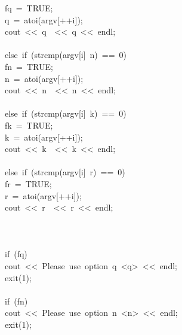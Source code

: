 \begin{tabbing}
\>\>\>fq\ =\ TRUE;\\[0pt]
\>\>\>q\ =\ atoi(argv[++i]);\\[0pt]
\>\>\>cout\ <<\ q\ \ <<\ q\ <<\ endl;\\[0pt]
\>\>\>\\[0pt]
\>\>else\ if\ (strcmp(argv[i]\ n)\ ==\ 0)\ \\[0pt]
\>\>\>fn\ =\ TRUE;\\[0pt]
\>\>\>n\ =\ atoi(argv[++i]);\\[0pt]
\>\>\>cout\ <<\ n\ \ <<\ n\ <<\ endl;\\[0pt]
\>\>\>\\[0pt]
\>\>else\ if\ (strcmp(argv[i]\ k)\ ==\ 0)\ \\[0pt]
\>\>\>fk\ =\ TRUE;\\[0pt]
\>\>\>k\ =\ atoi(argv[++i]);\\[0pt]
\>\>\>cout\ <<\ k\ \ <<\ k\ <<\ endl;\\[0pt]
\>\>\>\\[0pt]
\>\>else\ if\ (strcmp(argv[i]\ r)\ ==\ 0)\ \\[0pt]
\>\>\>fr\ =\ TRUE;\\[0pt]
\>\>\>r\ =\ atoi(argv[++i]);\\[0pt]
\>\>\>cout\ <<\ r\ \ <<\ r\ <<\ endl;\\[0pt]
\>\>\>\\[0pt]
\>\>\\[0pt]
\\[0pt]
\>if\ (fq)\ \\[0pt]
\>\>cout\ <<\ Please\ use\ option\ q\ <q>\ <<\ endl;\\[0pt]
\>\>exit(1);\\[0pt]
\>\>\\[0pt]
\>if\ (fn)\ \\[0pt]
\>\>cout\ <<\ Please\ use\ option\ n\ <n>\ <<\ endl;\\[0pt]
\>\>exit(1);\\[0pt]
\>\>\\[0pt]

\end{tabbing}

